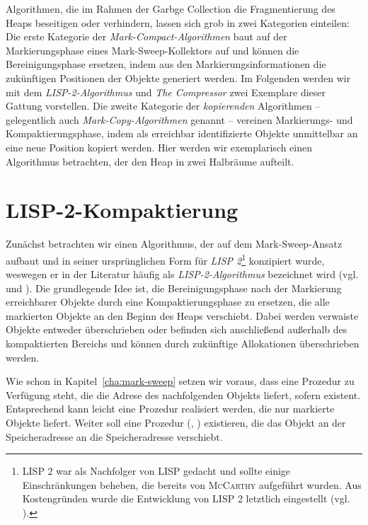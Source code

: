 Algorithmen, die im Rahmen der Garbge Collection die Fragmentierung des Heaps beseitigen oder verhindern, lassen sich grob in zwei Kategorien einteilen:
Die erste Kategorie der \textit{Mark-Compact-Algorithmen} baut auf der Markierungsphase eines Mark-Sweep-Kollektors auf und können die Bereinigungsphase ersetzen, indem aus den Markierungsinformationen die zukünftigen Positionen der Objekte generiert werden.
Im Folgenden werden wir mit dem \textit{LISP-2-Algorithmus} und \textit{The Compressor} zwei Exemplare dieser Gattung vorstellen.
Die zweite Kategorie der \textit{kopierenden} Algorithmen -- gelegentlich auch \textit{Mark-Copy-Algorithmen} genannt -- vereinen Markierungs- und Kompaktierungsphase, indem als erreichbar identifizierte Objekte unmittelbar an eine neue Position kopiert werden.
Hier werden wir exemplarisch einen Algorithmus betrachten, der den Heap in zwei Halbräume aufteilt.




\section{LISP-2-Kompaktierung}
\label{sec:lisp2-compact}
Zunächst betrachten wir einen Algorithmus, der auf dem Mark-Sweep-Ansatz aufbaut und in seiner ursprünglichen Form für \textit{LISP 2}\footnote{LISP 2 war als Nachfolger von LISP gedacht und sollte einige Einschränkungen beheben, die bereits von \textsc{McCarthy} aufgeführt wurden. Aus Kostengründen wurde die Entwicklung von LISP 2 letztlich eingestellt (vgl. \cite{lisp-history}).} konzipiert wurde, weswegen er in der Literatur häufig als \textit{LISP-2-Algorithmus} bezeichnet wird (vgl. \cite[Kap. 3.2]{handbook} und \cite{lisp2gc}).
Die grundlegende Idee ist, die Bereinigungsphase nach der Markierung erreichbarer Objekte durch eine Kompaktierungsphase zu ersetzen, die alle markierten Objekte an den Beginn des Heaps verschiebt.
Dabei werden verwaiste Objekte entweder überschrieben oder befinden sich anschließend außerhalb des kompaktierten Bereichs und können durch zukünftige Allokationen überschrieben werden.

Wie schon in Kapitel~\ref{cha:mark-sweep} setzen wir voraus, dass eine Prozedur zu Verfügung steht, die die Adrese des nachfolgenden Objekts liefert, sofern existent.
Entsprechend kann leicht eine Prozedur  realisiert werden, die nur markierte Objekte liefert.
Weiter soll eine Prozedur (, ) existieren, die das Objekt an der Speicheradresse  an die Speicheradresse  verschiebt.

